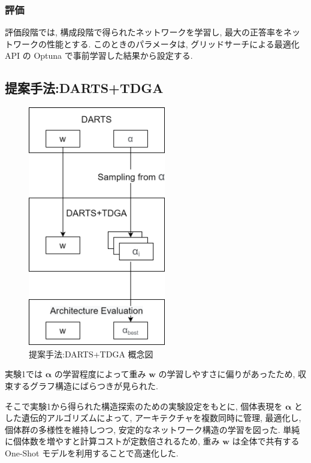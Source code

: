 \subsubsection{評価}
評価段階では, 構成段階で得られたネットワークを学習し,
最大の正答率をネットワークの性能とする.
このときのパラメータは, グリッドサーチによる最適化API の Optuna \cite{akiba2019optuna}
で事前学習した結果から設定する.




\clearpage\newpage
\changeindent{0cm}
\subsection{提案手法:DARTS+TDGA}
\label{sec:pred.02}
\changeindent{2cm}

\begin{figure}[t]
  \begin{center}
    \includegraphics[clip,width=6cm]{./fig/03.pred/datdga.png}
  \end{center}
  \caption{提案手法:DARTS+TDGA 概念図}
  \label{fig:image_ga}
\end{figure}

実験1では $\bm{\alpha}$ の学習程度によって重み $\bm{w}$ の学習しやすさに偏りがあったため,
収束するグラフ構造にばらつきが見られた.

そこで実験1から得られた構造探索のための実験設定をもとに,
個体表現を $\bm{\alpha}$ とした遺伝的アルゴリズムによって,
アーキテクチャを複数同時に管理, 最適化し,
個体群の多様性を維持しつつ, 安定的なネットワーク構造の学習を図った.
単純に個体数を増やすと計算コストが定数倍されるため,
重み $\bm{w}$ は全体で共有する One-Shot モデルを利用することで高速化した.


